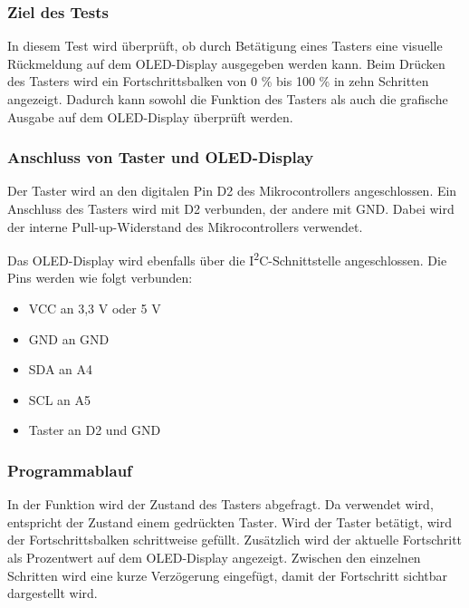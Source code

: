 \subsubsection{Ziel des Tests}

In diesem Test wird überprüft, ob durch Betätigung eines Tasters eine visuelle Rückmeldung auf dem OLED-Display ausgegeben werden kann. Beim Drücken des Tasters wird ein Fortschrittsbalken von 0 \% bis 100 \% in zehn Schritten angezeigt. Dadurch kann sowohl die Funktion des Tasters als auch die grafische Ausgabe auf dem OLED-Display überprüft werden.

\subsubsection{Anschluss von Taster und OLED-Display}

Der Taster wird an den digitalen Pin D2 des Mikrocontrollers angeschlossen. Ein Anschluss des Tasters wird mit D2 verbunden, der andere mit GND. Dabei wird der interne Pull-up-Widerstand des Mikrocontrollers verwendet.

Das OLED-Display wird ebenfalls über die I\textsuperscript{2}C-Schnittstelle angeschlossen. Die Pins werden wie folgt verbunden:

\begin{itemize}
	\item VCC an 3,3 V oder 5 V
	\item GND an GND
	\item SDA an A4
	\item SCL an A5
	\item Taster an D2 und GND
\end{itemize}

\subsubsection{Programmablauf}

In der Funktion  wird der Zustand des Tasters abgefragt. Da  verwendet wird, entspricht der Zustand  einem gedrückten Taster. Wird der Taster betätigt, wird der Fortschrittsbalken schrittweise gefüllt. Zusätzlich wird der aktuelle Fortschritt als Prozentwert auf dem OLED-Display angezeigt. Zwischen den einzelnen Schritten wird eine kurze Verzögerung eingefügt, damit der Fortschritt sichtbar dargestellt wird.

{
	\label{Code:Test:File:OLEDProgressBar}
}


